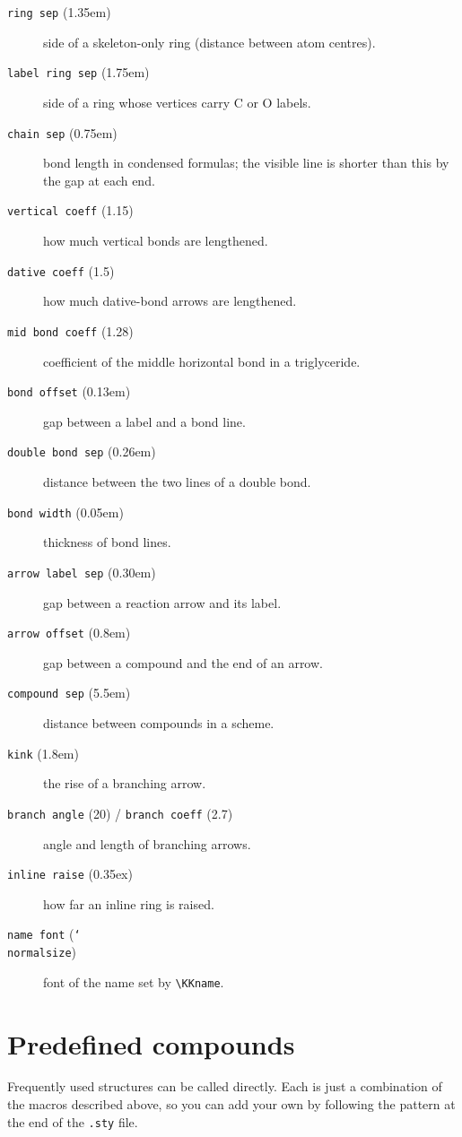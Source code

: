 \documentclass[paper=a4paper,fontsize=10pt]{jlreq}
\begin{document}
\begin{description}
\item[\texttt{ring sep} (1.35em)] side of a skeleton-only ring (distance between atom centres).
\item[\texttt{label ring sep} (1.75em)] side of a ring whose vertices carry C or O labels.
\item[\texttt{chain sep} (0.75em)] bond length in condensed formulas; the visible
      line is shorter than this by the gap at each end.
\item[\texttt{vertical coeff} (1.15)] how much vertical bonds are lengthened.
\item[\texttt{dative coeff} (1.5)] how much dative-bond arrows are lengthened.
\item[\texttt{mid bond coeff} (1.28)] coefficient of the middle horizontal bond in a triglyceride.
\item[\texttt{bond offset} (0.13em)] gap between a label and a bond line.
\item[\texttt{double bond sep} (0.26em)] distance between the two lines of a double bond.
\item[\texttt{bond width} (0.05em)] thickness of bond lines.
\item[\texttt{arrow label sep} (0.30em)] gap between a reaction arrow and its label.
\item[\texttt{arrow offset} (0.8em)] gap between a compound and the end of an arrow.
\item[\texttt{compound sep} (5.5em)] distance between compounds in a scheme.
\item[\texttt{kink} (1.8em)] the rise of a branching arrow.
\item[\texttt{branch angle} (20) / \texttt{branch coeff} (2.7)] angle and length of branching arrows.
\item[\texttt{inline raise} (0.35ex)] how far an inline ring is raised.
\item[\texttt{name font} (\texttt{\char`\\normalsize})] font of the name set by \verb|\KKname|.
\end{description}

\section{Predefined compounds}

Frequently used structures can be called directly. Each is just a combination of
the macros described above, so you can add your own by following the pattern at
the end of the \verb|.sty| file.
\end{document}
